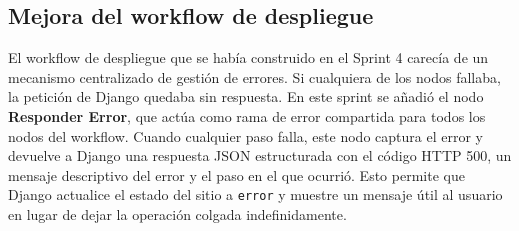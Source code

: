 \subsection{Mejora del workflow de despliegue}
\label{subsec:mejora-workflow-despliegue}

El workflow de despliegue que se había construido en el Sprint 4 carecía de un mecanismo centralizado de gestión de errores. Si cualquiera de los nodos fallaba, la petición de Django quedaba sin respuesta. En este sprint se añadió el nodo \textbf{Responder Error}, que actúa como rama de error compartida para todos los nodos del workflow. Cuando cualquier paso falla, este nodo captura el error y devuelve a Django una respuesta JSON estructurada con el código HTTP 500, un mensaje descriptivo del error y el paso en el que ocurrió. Esto permite que Django actualice el estado del sitio a \texttt{error} y muestre un mensaje útil al usuario en lugar de dejar la operación colgada indefinidamente.






